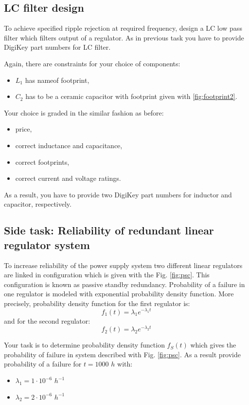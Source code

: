 \documentclass[a4paper]{article}
\begin{document}
\subsection{LC filter design}
\label{ele:task:2}
To achieve specified ripple rejection at required frequency, design a LC low 
pass filter which filters output of a regulator. As in previous task you have 
to provide DigiKey part numbers for LC filter. 

Again, there are constraints for your choice of components:
\begin{itemize}
\item $L_1$ has nameof footprint,
\item $C_2$ has to be a ceramic capacitor with footprint given with 
\ref{fig:footprint2}. 
\end{itemize}

Your choice is graded in the similar fashion as before:
\begin{itemize}
\item price,
\item correct inductance and capacitance,
\item correct footprints, 
\item correct current and voltage ratings.
\end{itemize}
As a result, you have to provide two DigiKey part numbers for inductor and 
capacitor, respectively. 

\subsection{Side task: Reliability of redundant linear regulator system}
\label{ele:task:3}
To increase reliability of the power supply system two different linear 
regulators are linked in configuration which is given with the Fig. 
\ref{fig:psc}. This configuration is known as passive standby redundancy. 
Probability of a failure in one regulator is modeled with exponential 
probability density function. More precisely, probability density function for 
the first regulator is:  
\begin{equation}
f_1(t) = \lambda_1 e^{-\lambda_1 t}
\end{equation}
and for the second regulator:
\begin{equation}
f_2(t) = \lambda_2 e^{-\lambda_2 t}
\end{equation}

Your task is to determine probability density function $f_S(t)$ which gives the
probability of failure in system described with Fig. \ref{fig:psc}. As a result 
provide probability of a failure for $t = 1000$ $h$ with:
\begin{itemize}
\item[] $\lambda_1 = 1 \cdot10^{-6}$ $h^{-1}$
\item[] $\lambda_2 = 2 \cdot10^{-6}$ $h^{-1}$ 
\end{itemize} 
\end{document}

